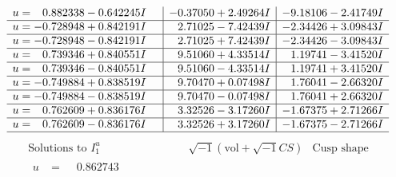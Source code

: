 \documentclass[1p]{elsarticle_modified}
\theoremstyle{definition}
\newcommand{\I}{\sqrt{-1}}
\begin{document}
$$\begin{array}{c|c|c}
\begin{aligned}
u &= \phantom{-}0.882338 - 0.642245 I\end{aligned}
 & -0.37050 + 2.49264 I & -9.18106 - 2.41749 I \\ \hline\begin{aligned}
u &= -0.728948 + 0.842191 I\end{aligned}
 & \phantom{-}2.71025 - 7.42439 I & -2.34426 + 3.09843 I \\ \hline\begin{aligned}
u &= -0.728948 - 0.842191 I\end{aligned}
 & \phantom{-}2.71025 + 7.42439 I & -2.34426 - 3.09843 I \\ \hline\begin{aligned}
u &= \phantom{-}0.739346 + 0.840551 I\end{aligned}
 & \phantom{-}9.51060 + 4.33514 I & \phantom{-}1.19741 - 3.41520 I \\ \hline\begin{aligned}
u &= \phantom{-}0.739346 - 0.840551 I\end{aligned}
 & \phantom{-}9.51060 - 4.33514 I & \phantom{-}1.19741 + 3.41520 I \\ \hline\begin{aligned}
u &= -0.749884 + 0.838519 I\end{aligned}
 & \phantom{-}9.70470 + 0.07498 I & \phantom{-}1.76041 - 2.66320 I \\ \hline\begin{aligned}
u &= -0.749884 - 0.838519 I\end{aligned}
 & \phantom{-}9.70470 - 0.07498 I & \phantom{-}1.76041 + 2.66320 I \\ \hline\begin{aligned}
u &= \phantom{-}0.762609 + 0.836176 I\end{aligned}
 & \phantom{-}3.32526 - 3.17260 I & -1.67375 + 2.71266 I \\ \hline\begin{aligned}
u &= \phantom{-}0.762609 - 0.836176 I\end{aligned}
 & \phantom{-}3.32526 + 3.17260 I & -1.67375 - 2.71266 I\\
 \hline 
 \end{array}$$\newpage$$\begin{array}{c|c|c}  
\text{Solutions to }I^u_{1}& \I (\text{vol} + \sqrt{-1}CS) & \text{Cusp shape}\\
 \hline 
\begin{aligned}
u &= \phantom{-}0.862743\phantom{ +0.000000I}\end{aligned}

\end{array}$$
\end{document}
